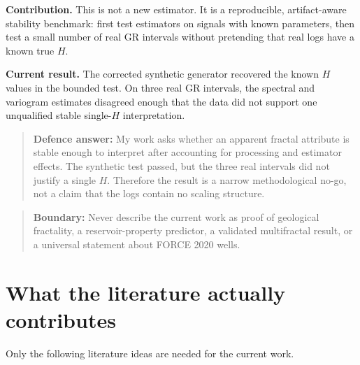 \documentclass[11pt,a4paper]{article}
\newcommand{\warning}[1]{\begin{quote}\color{Amber}\textbf{Boundary:} #1\end{quote}}
\newcommand{\answer}[1]{\begin{quote}\color{Navy}\textbf{Defence answer:} #1\end{quote}}
\begin{document}
\textbf{Contribution.} This is not a new estimator. It is a reproducible, artifact-aware stability benchmark: first test estimators on signals with known parameters, then test a small number of real GR intervals without pretending that real logs have a known true $H$.

\textbf{Current result.} The corrected synthetic generator recovered the known $H$ values in the bounded test. On three real GR intervals, the spectral and variogram estimates disagreed enough that the data did not support one unqualified stable single-$H$ interpretation.

\answer{My work asks whether an apparent fractal attribute is stable enough to interpret after accounting for processing and estimator effects. The synthetic test passed, but the three real intervals did not justify a single $H$. Therefore the result is a narrow methodological no-go, not a claim that the logs contain no scaling structure.}

\warning{Never describe the current work as proof of geological fractality, a reservoir-property predictor, a validated multifractal result, or a universal statement about FORCE 2020 wells.}

\section{What the literature actually contributes}
Only the following literature ideas are needed for the current work.
\end{document}
